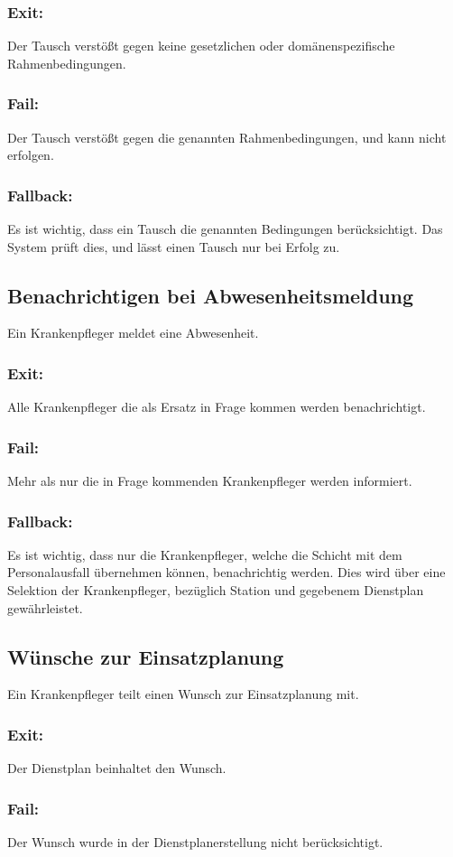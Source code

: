 \documentclass[10pt,a4paper]{article}
\begin{document}
\subsubsection{Exit:}
Der Tausch verstößt gegen keine gesetzlichen oder domänenspezifische Rahmenbedingungen.
\subsubsection{Fail:}
Der Tausch verstößt gegen die genannten Rahmenbedingungen, und kann nicht erfolgen.
\subsubsection{Fallback:}
Es ist wichtig, dass ein Tausch die genannten Bedingungen berücksichtigt. Das System prüft dies, und lässt einen Tausch nur bei Erfolg zu.
\subsection{Benachrichtigen bei Abwesenheitsmeldung}
Ein Krankenpfleger meldet eine Abwesenheit.
\subsubsection{Exit:}
Alle Krankenpfleger die als Ersatz in Frage kommen werden benachrichtigt. 
\subsubsection{Fail:}
Mehr als nur die in Frage kommenden Krankenpfleger werden informiert.
\subsubsection{Fallback:}
Es ist wichtig, dass nur die Krankenpfleger, welche die Schicht mit dem Personalausfall übernehmen können, benachrichtig werden. Dies wird über eine Selektion der Krankenpfleger, bezüglich Station und gegebenem Dienstplan gewährleistet.
\subsection{Wünsche zur Einsatzplanung}
Ein Krankenpfleger teilt einen Wunsch zur Einsatzplanung mit.
\subsubsection{Exit:}
Der Dienstplan beinhaltet den Wunsch. 
\subsubsection{Fail:}
Der Wunsch wurde in der Dienstplanerstellung nicht berücksichtigt.
\end{document}
